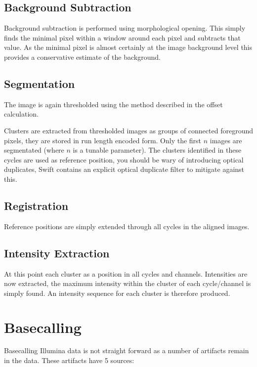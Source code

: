 \documentclass{report}
\begin{document}
\section{Background Subtraction}

Background subtraction is performed using morphological opening. This simply finds the minimal pixel within a window around each pixel and subtracts that value. As the minimal pixel is almost certainly at the image background level this provides a conservative estimate of the background.

\section{Segmentation}

The image is again thresholded using the method described in the offset calculation.

Clusters are extracted from thresholded images as groups of connected foreground pixels, they are stored in run length encoded form. Only the first $n$ images are segmentated (where $n$ is a tunable parameter). The clusters identified in these cycles are used as reference position, you should be wary of introducing optical duplicates, Swift contains an explicit optical duplicate filter to mitigate against this.

\section{Registration}

Reference positions are simply extended through all cycles in the aligned images.

\section{Intensity Extraction}

At this point each cluster as a position in all cycles and channels. Intensities are now extracted, the maximum intensity within the cluster of each cycle/channel is simply found. An intensity sequence for each cluster is therefore produced.

\chapter{Basecalling}

Basecalling Illumina data is not straight forward as a number of artifacts remain in the data. These artifacts have 5 sources:
\end{document}
